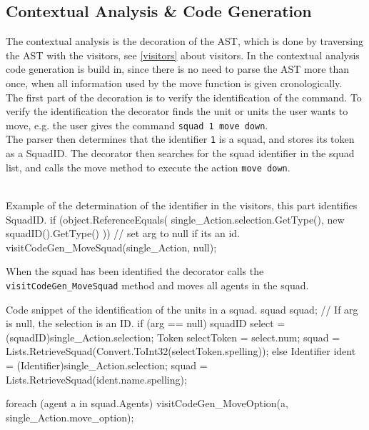 \subsection{Contextual Analysis \& Code Generation}
\label{sec:ai_contextual_analysis}
The contextual analysis is the decoration of the AST, which is done by traversing the AST with the visitors, see \ref{visitors} about visitors. In the contextual analysis code generation is build in, since there is no need to parse the AST more than once, when all information used by the move function is given cronologically.\\
The first part of the decoration is to verify the identification of the command.
To verify the identification the decorator finds the unit or units the user wants to move, e.g. the user gives the command \texttt{squad 1 move down}.\\
The parser then determines that the identifier \texttt{1} is a squad, and stores its token as a SquadID. The decorator then searches for the squad identifier in the squad list, and calls the move method to execute the action \texttt{move down}.\\
\\

\begin{source}{Example of the determination of the identifier in the visitors, this part identifies SquadID.}{}
if (object.ReferenceEquals(
	single_Action.selection.GetType(), 
	new squadID().GetType()
	))
	{
	// set arg to null if its an id.
	visitCodeGen_MoveSquad(single_Action, null);
	}
\end{source}

When the squad has been identified the decorator calls the \texttt{visitCodeGen\_MoveSquad} method and moves all agents in the squad.\\

\begin{source}{Code snippet of the identification of the units in a squad.}{}
squad squad;
// If arg is null, the selection is an ID.
if (arg == null)
	{
    squadID select = (squadID)single_Action.selection;
    Token selectToken = select.num;
    squad = Lists.RetrieveSquad(Convert.ToInt32(selectToken.spelling));
	}
else
    {
		Identifier ident = (Identifier)single_Action.selection;
		squad = Lists.RetrieveSquad(ident.name.spelling);
	}

	foreach (agent a in squad.Agents)
	{
		visitCodeGen_MoveOption(a, single_Action.move_option);
	}
\end{source}

